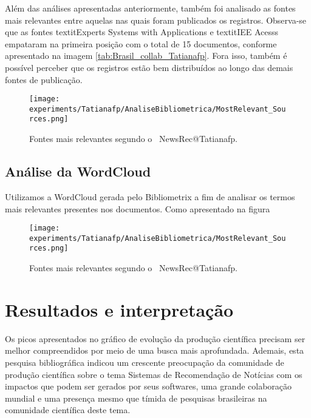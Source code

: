 Além das análises apresentadas anteriormente, também foi analisado as fontes mais relevantes entre aquelas nas quais foram publicados os registros. Observa-se que as fontes textit{Experts Systems with Applications} e textit{IEE Acesss} empataram na primeira posição com o total de 15 documentos, conforme apresentado na imagem \ref{tab:Brasil_collab_Tatianafp}. Fora isso, também é possível perceber que os registros estão bem distribuídos ao longo das demais fontes de publicação. 

\begin{figure}
    \centering
    \texttt{[image: experiments/Tatianafp/AnaliseBibliometrica/MostRelevant\_Sources.png]}
    \caption{Fontes mais relevantes segundo o \dataset\ NewsRec@Tatianafp.}
    \label{fig:relevant_sources_NewsRec_Tatianafp}
\end{figure}

\subsection{Análise da WordCloud }

Utilizamos a WordCloud gerada pelo Bibliometrix a fim de analisar os termos mais relevantes presentes nos documentos. Como apresentado na figura

\begin{figure}
    \centering
    \texttt{[image: experiments/Tatianafp/AnaliseBibliometrica/MostRelevant\_Sources.png]}
    \caption{Fontes mais relevantes segundo o \dataset\ NewsRec@Tatianafp.}
    \label{fig:relevant_sources_NewsRec_Tatianafp}
\end{figure}

\section{Resultados e interpretação}

Os picos apresentados no gráfico de evolução da produção científica precisam ser melhor compreendidos por meio de uma busca mais aprofundada. Ademais, esta pesquisa bibliográfica indicou um crescente preocupação da comunidade de produção científica  sobre o tema Sistemas de Recomendação de Notícias com os impactos que podem ser gerados por seus softwares, uma grande colaboração mundial e uma presença mesmo que tímida de pesquisas brasileiras na comunidade científica deste tema. 